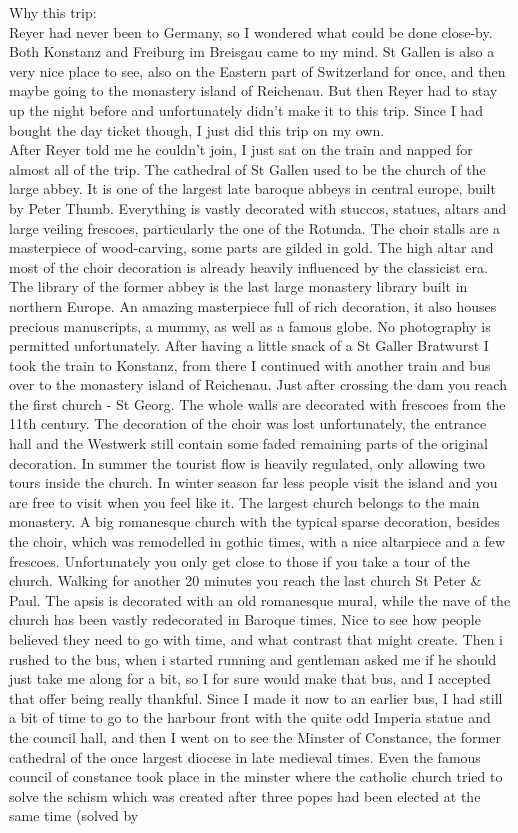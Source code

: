 Why this trip:\\
Reyer had never been to Germany, so I wondered what could be done close-by. Both Konstanz and Freiburg im Breisgau came to my mind. St Gallen is also a very nice place to see, also on the Eastern part of Switzerland for once, and then maybe going to the monastery island of Reichenau. But then Reyer had to stay up the night before and unfortunately didn't make it to this trip. Since I had bought the day ticket though, I just did this trip on my own.\\

After Reyer told me he couldn't join, I just sat on the train and napped for almost all of the trip. The cathedral of St Gallen used to be the church of the large abbey. It is one of the largest late baroque abbeys in central europe, built by Peter Thumb. Everything is vastly decorated with stuccos, statues, altars and large veiling frescoes, particularly the one of the Rotunda. The choir stalls are a masterpiece of wood-carving, some parts are gilded in gold. The high altar and most of the choir decoration is already heavily influenced by the classicist era. The library of the former abbey is the last large monastery library built in northern Europe. An amazing masterpiece full of rich decoration, it also houses precious manuscripts, a mummy, as well as a famous globe. No photography is permitted unfortunately. After having a little snack of a St Galler Bratwurst I took the train to Konstanz, from there I continued with another train and bus over to the monastery island of Reichenau. Just after crossing the dam you reach the first church - St Georg. The whole walls are decorated with frescoes from the 11th century. The decoration of the choir was lost unfortunately, the entrance hall and the Westwerk still contain some faded remaining parts of the original decoration. In summer the tourist flow is heavily regulated, only allowing two tours inside the church. In winter season far less people visit the island and you are free to visit when you feel like it. The largest church belongs to the main monastery. A big romanesque church with the typical sparse decoration, besides the choir, which was remodelled in gothic times, with a nice altarpiece and a few frescoes. Unfortunately you only get close to those if you take a tour of the church. Walking for another 20 minutes you reach the last church St Peter \& Paul. The apsis is decorated with an old romanesque mural, while the nave of the church has been vastly redecorated in Baroque times. Nice to see how people believed they need to go with time, and what contrast that might create. Then i rushed to the bus, when i started running and gentleman asked me if he should just take me along for a bit, so I for sure would make that bus, and I accepted that offer being really thankful. Since I made it now to an earlier bus, I had still a bit of time to go to the harbour front with the quite odd Imperia statue and the council hall, and then I went on to see the Minster of Constance, the former cathedral of the once largest diocese in late medieval times. Even the famous council of constance took place in the minster where the catholic church tried to solve the schism which was created after three popes had been elected at the same time (solved by 